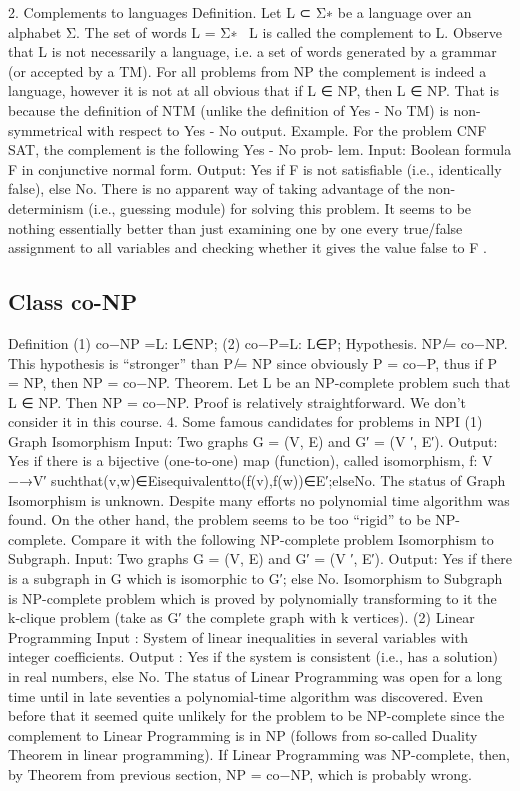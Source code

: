 2. Complements to languages
Definition. Let L ⊂ Σ∗ be a language over an alphabet Σ. The set of words L = Σ∗ \ L
is called the complement to L.
Observe that L is not necessarily a language, i.e. a set of words generated by a grammar (or accepted by a TM). For all problems from NP the complement is indeed a language, however it is not at all obvious that if L ∈ NP, then L ∈ NP. That is because the definition of NTM (unlike the definition of Yes - No TM) is non-symmetrical with respect to Yes - No output.
Example. For the problem CNF SAT, the complement is the following Yes - No prob- lem.
Input: Boolean formula F in conjunctive normal form.
Output: Yes if F is not satisfiable (i.e., identically false), else No.
There is no apparent way of taking advantage of the non-determinism (i.e., guessing module) for solving this problem. It seems to be nothing essentially better than just examining one by one every true/false assignment to all variables and checking whether it gives the value false to F .

\subsection{Class co-NP}
Definition
 (1) co−NP ={L: L∈NP}; (2) co−P={L: L∈P};
 Hypothesis. NP ̸= co−NP.
This hypothesis is “stronger” than P ̸= NP since obviously P = co−P, thus if
P = NP, then NP = co−NP.
Theorem. Let L be an NP-complete problem such that L ∈ NP. Then NP = co−NP.
Proof is relatively straightforward. We don’t consider it in this course.
4. Some famous candidates for problems in NPI
(1) Graph Isomorphism
Input: Two graphs G = (V, E) and G′ = (V ′, E′).
Output: Yes if there is a bijective (one-to-one) map (function), called isomorphism, f: V −→V′ suchthat(v,w)∈Eisequivalentto(f(v),f(w))∈E′;elseNo.
The status of Graph Isomorphism is unknown. Despite many efforts no polynomial time algorithm was found. On the other hand, the problem seems to be too “rigid” to be NP-complete. Compare it with the following NP-complete problem Isomorphism to Subgraph.
Input: Two graphs G = (V, E) and G′ = (V ′, E′).
Output: Yes if there is a subgraph in G which is isomorphic to G′; else No.
Isomorphism to Subgraph is NP-complete problem which is proved by polynomially transforming to it the k-clique problem (take as G′ the complete graph with k vertices).
(2) Linear Programming
Input : System of linear inequalities in several variables with integer coefficients. Output : Yes if the system is consistent (i.e., has a solution) in real numbers, else No.
The status of Linear Programming was open for a long time until in late seventies a polynomial-time algorithm was discovered. Even before that it seemed quite unlikely for the problem to be NP-complete since the complement to Linear Programming is in NP (follows from so-called Duality Theorem in linear programming). If Linear Programming was NP-complete, then, by Theorem from previous section, NP = co−NP, which is probably wrong.

